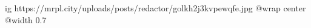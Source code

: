 
 
 
 
 

\ifcmt
  ig https://mrpl.city/uploads/posts/redactor/golkh2j3kvpewqfe.jpg
  @wrap center
  @width 0.7
\fi

